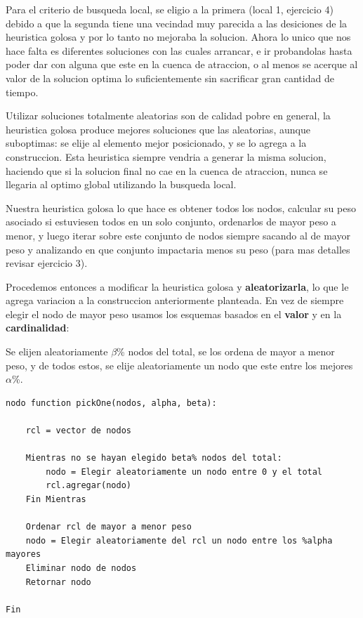 \documentclass[10pt,a4paper]{article}
\begin{document}
Para el criterio de busqueda local, se eligio a la primera (local 1, ejercicio 4) debido a que la segunda tiene una vecindad muy parecida a las desiciones de la heuristica golosa y por lo tanto no mejoraba  la solucion. Ahora lo unico que nos hace falta es diferentes soluciones con las cuales arrancar, e ir probandolas hasta poder dar con alguna que este en la cuenca de atraccion, o al menos se acerque al valor de la solucion optima lo suficientemente sin sacrificar gran cantidad de tiempo.

\bigskip
Utilizar soluciones totalmente aleatorias son de calidad pobre en general, la heuristica golosa produce mejores soluciones que las aleatorias, aunque suboptimas: se elije al elemento mejor posicionado, y se lo agrega a la construccion. Esta heuristica siempre vendria a generar la misma solucion, haciendo que si la solucion final no cae en la cuenca de atraccion, nunca se llegaria al optimo global utilizando la busqueda local.

\bigskip
Nuestra heuristica golosa lo que hace es obtener todos los nodos, calcular su peso asociado si estuviesen todos en un solo conjunto, ordenarlos de mayor peso a menor, y luego iterar sobre este conjunto de nodos siempre sacando al de mayor peso y analizando en que conjunto impactaria menos su peso (para mas detalles revisar ejercicio 3).

\newpage
Procedemos entonces a modificar la heuristica golosa y \textbf{aleatorizarla}, lo que le agrega variacion a la construccion anteriormente planteada. En vez de siempre elegir el nodo de mayor peso usamos los esquemas basados en el \textbf{valor} y en la \textbf{cardinalidad}:

\bigskip
Se elijen aleatoriamente $\beta$\% nodos del total, se los ordena de mayor a menor peso, y de todos estos, se elije aleatoriamente un nodo que este entre los mejores $\alpha$\%.

\begin{lstlisting}
nodo function pickOne(nodos, alpha, beta):

	rcl = vector de nodos
	
	Mientras no se hayan elegido beta% nodos del total:
		nodo = Elegir aleatoriamente un nodo entre 0 y el total
		rcl.agregar(nodo)
	Fin Mientras
	
	Ordenar rcl de mayor a menor peso
	nodo = Elegir aleatoriamente del rcl un nodo entre los %alpha mayores
	Eliminar nodo de nodos
	Retornar nodo
	
Fin
\end{lstlisting}
\end{document}
